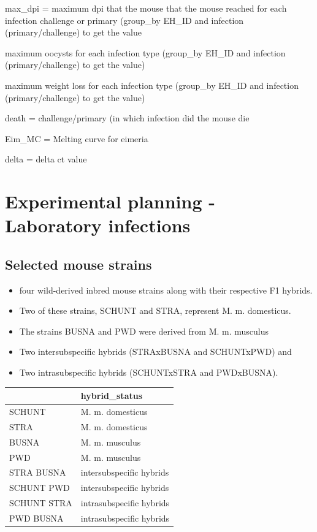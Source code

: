 \documentclass[
]{article}
\providecommand{\tightlist}{%
  \setlength{\itemsep}{0pt}\setlength{\parskip}{0pt}}
\begin{document}
max\_dpi = maximum dpi that the mouse that the mouse reached for each
infection challenge or primary (group\_by EH\_ID and infection
(primary/challenge) to get the value

maximum oocysts for each infection type (group\_by EH\_ID and infection
(primary/challenge) to get the value)

maximum weight loss for each infection type (group\_by EH\_ID and
infection (primary/challenge) to get the value)

death = challenge/primary (in which infection did the mouse die

Eim\_MC = Melting curve for eimeria

delta = delta ct value

\section{Experimental planning - Laboratory
infections}\label{experimental-planning---laboratory-infections}

\subsection{Selected mouse strains}\label{selected-mouse-strains}

\begin{itemize}
\tightlist
\item
  four wild-derived inbred mouse strains along with their respective F1
  hybrids.
\item
  Two of these strains, SCHUNT and STRA, represent M. m. domesticus.
\item
  The strains BUSNA and PWD were derived from M. m. musculus
\item
  Two intersubspecific hybrids (STRAxBUSNA and SCHUNTxPWD) and
\item
  Two intrasubspecific hybrids (SCHUNTxSTRA and PWDxBUSNA).
\end{itemize}

\begin{tabular}{l|l}
\hline
  & hybrid\_status\\
\hline
SCHUNT & M. m. domesticus\\
\hline
STRA & M. m. domesticus\\
\hline
BUSNA & M. m. musculus\\
\hline
PWD & M. m. musculus\\
\hline
STRA BUSNA & intersubspecific hybrids\\
\hline
SCHUNT PWD & intersubspecific hybrids\\
\hline
SCHUNT STRA & intrasubspecific hybrids\\
\hline
PWD BUSNA & intrasubspecific hybrids\\
\hline
\end{tabular}
\end{document}
